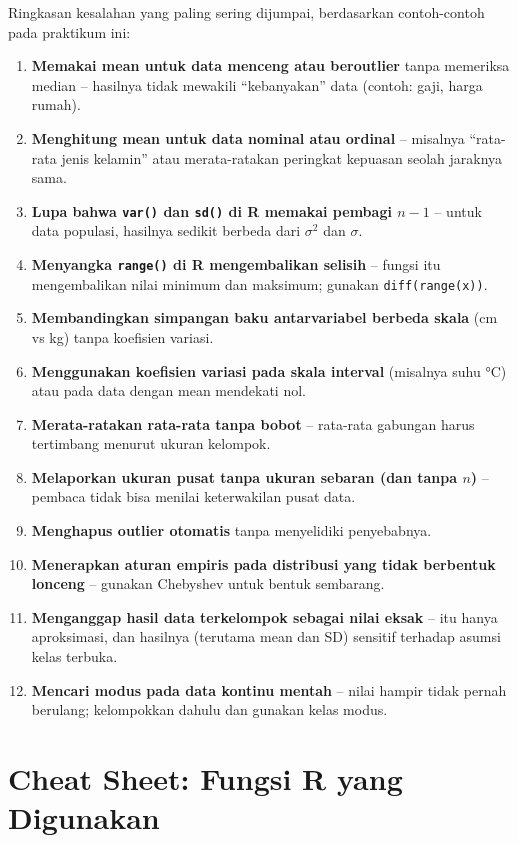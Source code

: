 \documentclass[
  indonesian,
  letterpaper,
]{book}
\providecommand{\tightlist}{%
  \setlength{\itemsep}{0pt}\setlength{\parskip}{0pt}}
\begin{document}
Ringkasan kesalahan yang paling sering dijumpai, berdasarkan
contoh-contoh pada praktikum ini:

\begin{enumerate}
\def\labelenumi{\arabic{enumi}.}
\tightlist
\item
  \textbf{Memakai mean untuk data menceng atau beroutlier} tanpa
  memeriksa median -- hasilnya tidak mewakili ``kebanyakan'' data
  (contoh: gaji, harga rumah).
\item
  \textbf{Menghitung mean untuk data nominal atau ordinal} -- misalnya
  ``rata-rata jenis kelamin'' atau merata-ratakan peringkat kepuasan
  seolah jaraknya sama.
\item
  \textbf{Lupa bahwa \texttt{var()} dan \texttt{sd()} di R memakai
  pembagi \(n-1\)} -- untuk data populasi, hasilnya sedikit berbeda dari
  \(\sigma^2\) dan \(\sigma\).
\item
  \textbf{Menyangka \texttt{range()} di R mengembalikan selisih} --
  fungsi itu mengembalikan nilai minimum dan maksimum; gunakan
  \texttt{diff(range(x))}.
\item
  \textbf{Membandingkan simpangan baku antarvariabel berbeda skala} (cm
  vs kg) tanpa koefisien variasi.
\item
  \textbf{Menggunakan koefisien variasi pada skala interval} (misalnya
  suhu °C) atau pada data dengan mean mendekati nol.
\item
  \textbf{Merata-ratakan rata-rata tanpa bobot} -- rata-rata gabungan
  harus tertimbang menurut ukuran kelompok.
\item
  \textbf{Melaporkan ukuran pusat tanpa ukuran sebaran (dan tanpa
  \(n\))} -- pembaca tidak bisa menilai keterwakilan pusat data.
\item
  \textbf{Menghapus outlier otomatis} tanpa menyelidiki penyebabnya.
\item
  \textbf{Menerapkan aturan empiris pada distribusi yang tidak berbentuk
  lonceng} -- gunakan Chebyshev untuk bentuk sembarang.
\item
  \textbf{Menganggap hasil data terkelompok sebagai nilai eksak} -- itu
  hanya aproksimasi, dan hasilnya (terutama mean dan SD) sensitif
  terhadap asumsi kelas terbuka.
\item
  \textbf{Mencari modus pada data kontinu mentah} -- nilai hampir tidak
  pernah berulang; kelompokkan dahulu dan gunakan kelas modus.
\end{enumerate}

\section{Cheat Sheet: Fungsi R yang
Digunakan}\label{cheat-sheet-fungsi-r-yang-digunakan-4}
\end{document}
